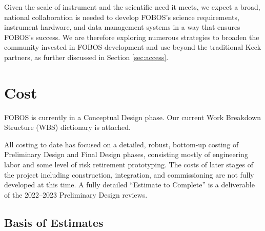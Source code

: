\documentclass[oneside,11pt]{amsart}
\begin{document}
Given the scale of instrument and the scientific need it meets, we
expect a broad, national collaboration is needed to develop FOBOS's
science requirements, instrument hardware, and data management
systems in a way that ensures FOBOS's success. We are therefore
exploring numerous strategies to broaden the community invested in
FOBOS development and use beyond the traditional Keck partners, as
further discussed in Section \ref{sec:access}.

\section{Cost}
\label{sec:cost}






FOBOS is currently in a Conceptual Design phase. Our current Work
Breakdown Structure (WBS) dictionary is attached.

All costing to date has focused on a detailed, robust, bottom-up
costing of Preliminary Design and Final Design phases, consisting
mostly of engineering labor and some level of risk retirement
prototyping. The costs of later stages of the project including
construction, integration, and commissioning are not fully developed
at this time. A fully detailed ``Estimate to Complete''  is a deliverable of the 2022--2023 Preliminary Design reviews.

\subsection{Basis of Estimates}
\end{document}
